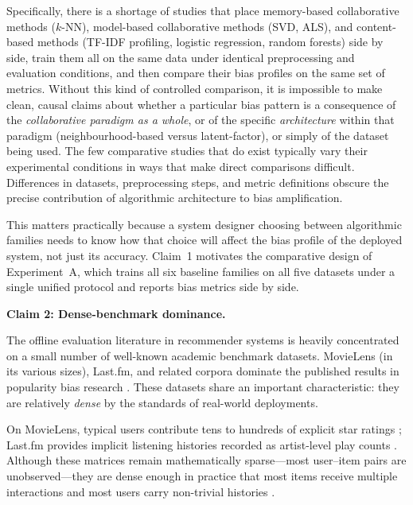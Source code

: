 \documentclass[11pt,a4paper]{report}
\begin{document}
Specifically, there is a shortage of studies that place memory-based collaborative methods ($k$-NN), model-based collaborative methods (SVD, ALS), and content-based methods (TF-IDF profiling, logistic regression, random forests) side by side, train them all on the same data under identical preprocessing and evaluation conditions, and then compare their bias profiles on the same set of metrics. Without this kind of controlled comparison, it is impossible to make clean, causal claims about whether a particular bias pattern is a consequence of the \emph{collaborative paradigm as a whole}, or of the specific \emph{architecture} within that paradigm (neighbourhood-based versus latent-factor), or simply of the dataset being used. The few comparative studies that do exist typically vary their experimental conditions in ways that make direct comparisons difficult. Differences in datasets, preprocessing steps, and metric definitions obscure the precise contribution of algorithmic architecture to bias amplification.

This matters practically because a system designer choosing between algorithmic families needs to know how that choice will affect the bias profile of the deployed system, not just its accuracy. Claim~1 motivates the comparative design of Experiment~A, which trains all six baseline families on all five datasets under a single unified protocol and reports bias metrics side by side.

\vspace{0.75em}
\noindent\textbf{Claim 2: Dense-benchmark dominance.}

The offline evaluation literature in recommender systems is heavily concentrated on a small number of well-known academic benchmark datasets. MovieLens (in its various sizes), Last.fm, and related corpora dominate the published results in popularity bias research \citep{klimashevskaia2024survey}. These datasets share an important characteristic: they are relatively \emph{dense} by the standards of real-world deployments.

On MovieLens, typical users contribute tens to hundreds of explicit star ratings \citep{harper2015movielens}; Last.fm provides implicit listening histories recorded as artist-level play counts \citep{cantador2011second}. Although these matrices remain mathematically sparse---most user--item pairs are unobserved---they are dense enough in practice that most items receive multiple interactions and most users carry non-trivial histories \citep{harper2015movielens, cantador2011second}.
\end{document}
